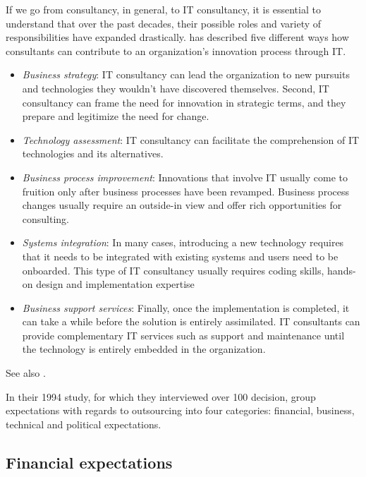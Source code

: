 \documentclass[12pt]{article}
\providecommand{\tightlist}{%
  \setlength{\itemsep}{0pt}\setlength{\parskip}{0pt}}
\begin{document}
If we go from consultancy, in general, to IT consultancy, it is
essential to understand that over the past decades, their possible roles
and variety of responsibilities have expanded drastically.
\citet[20-25]{swanson2010} has described five different ways how
consultants can contribute to an organization's innovation process
through IT.

\begin{itemize}
\tightlist
\item
  \emph{Business strategy}: IT consultancy can lead the organization to
  new pursuits and technologies they wouldn't have discovered
  themselves. Second, IT consultancy can frame the need for innovation
  in strategic terms, and they prepare and legitimize the need for
  change.
\item
  \emph{Technology assessment}: IT consultancy can facilitate the
  comprehension of IT technologies and its alternatives.
\item
  \emph{Business process improvement}: Innovations that involve IT
  usually come to fruition only after business processes have been
  revamped. Business process changes usually require an outside-in view
  and offer rich opportunities for consulting.
\item
  \emph{Systems integration}: In many cases, introducing a new
  technology requires that it needs to be integrated with existing
  systems and users need to be onboarded. This type of IT consultancy
  usually requires coding skills, hands-on design and implementation
  expertise
\item
  \emph{Business support services}: Finally, once the implementation is
  completed, it can take a while before the solution is entirely
  assimilated. IT consultants can provide complementary IT services such
  as support and maintenance until the technology is entirely embedded
  in the organization.
\end{itemize}

See also \citep{bessant1995}.

In their 1994 study, for which they interviewed over 100 decision,
\citet[10-17]{lacity1994} group expectations with regards to outsourcing
into four categories: financial, business, technical and political
expectations.

\hypertarget{financial-expectations}{%
\subsection{Financial expectations}\label{financial-expectations}}
\end{document}
